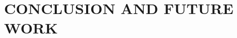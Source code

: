 \documentclass[]{spie}  %
\begin{document}
\section{CONCLUSION AND FUTURE WORK}


\acknowledgments         


 
\end{document}
